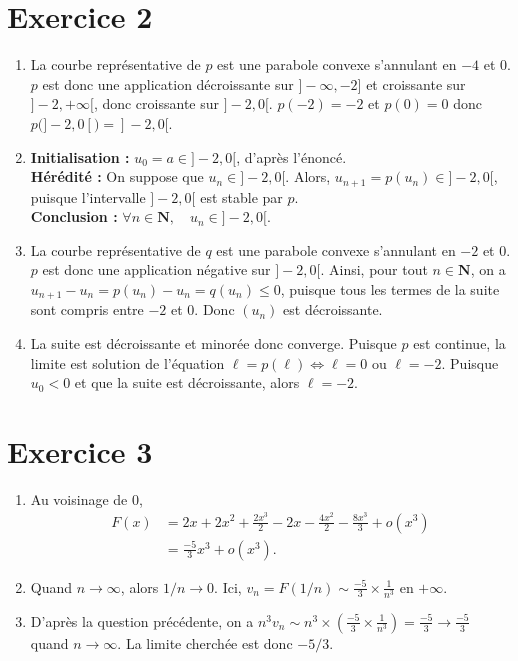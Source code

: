 \documentclass[10pt,a4paper,french]{article}
\begin{document}
\section*{Exercice 2}

\begin{enumerate}
	\item La courbe représentative de $p$ est une parabole convexe s'annulant en $-4$ et 0. $p$ est donc une application décroissante sur $]-\infty,-2]$ et croissante sur $]-2,+\infty[$, donc croissante sur $]-2,0[$. $p(-2) = -2$ et $p(0) = 0$ donc $p(]-2,0[) = ]-2,0[$.
	
	\item \textbf{Initialisation :} $u_0 = a \in ]-2,0[$, d'après l'énoncé. \\
	
	\textbf{Hérédité :} On suppose que $u_n \in ]-2,0[$. Alors, $u_{n+1} = p(u_n) \in ]-2,0[$, puisque l'intervalle $]-2,0[$ est stable par $p$. \\
	
	\textbf{Conclusion :} $\forall n \in \mathbf{N}, \quad u_n \in ]-2,0[$.
	
	\item La courbe représentative de $q$ est une parabole convexe s'annulant en $-2$ et 0. $p$ est donc une application négative sur $]-2,0[$. Ainsi, pour tout $n \in \mathbf{N}$, on a $u_{n+1}- u_n = p(u_n) - u_n = q(u_n) \leq 0$, puisque tous les termes de la suite sont compris entre $-2$ et 0. Donc $(u_n)$ est décroissante.
	
	\item La suite est décroissante et minorée donc converge. Puisque $p$ est continue, la limite est solution de l'équation $\ell = p(\ell) \Longleftrightarrow \ell = 0 \text{ ou } \ell = -2$. Puisque $u_0 < 0$ et que la suite est décroissante, alors $\ell = -2$.
	
\end{enumerate}



\section*{Exercice 3}

\begin{enumerate}
	\item Au voisinage de 0,
	\begin{align*}
		F(x) &= 2x + 2x^2 + \frac{2x^3}{2} - 2x - \frac{4x^2}{2} - \frac{8x^3}{3} + o(x^3) \\
		&= \frac{-5}{3}x^3 + o(x^3).
	\end{align*}
	
	\item Quand $n \to \infty$, alors $1/n \to 0$. Ici, $v_n = F(1/n) \sim \frac{-5}{3} \times \frac{1}{n^3}$ en $+\infty$.
	
	\item D'après la question précédente, on a $n^3 v_n \sim n^3 \times \left( \frac{-5}{3} \times \frac{1}{n^3}\right) = \frac{-5}{3} \to \frac{-5}{3}$ quand $n \to \infty$. La limite cherchée est donc $-5/3$.
\end{enumerate}
\end{document}
